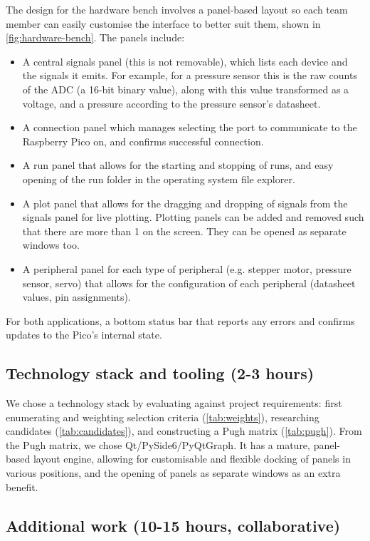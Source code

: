 \documentclass[10pt, a4paper]{article}
\begin{document}
The design for the hardware bench involves a panel-based layout so each team member can easily customise the interface to better suit them, shown in \autoref{fig:hardware-bench}.
The panels include:

\begin{itemize}[noitemsep]
  \item A central signals panel (this is not removable), which lists each device and the signals it emits. For example, for a pressure sensor this is the raw counts of the ADC (a 16-bit binary value), along with this value transformed as a voltage, and a pressure according to the pressure sensor's datasheet.
  \item A connection panel which manages selecting the port to communicate to the Raspberry Pico on, and confirms successful connection.
  \item A run panel that allows for the starting and stopping of runs, and easy opening of the run folder in the operating system file explorer.
  \item A plot panel that allows for the dragging and dropping of signals from the signals panel for live plotting. Plotting panels can be added and removed such that there are more than 1 on the screen. They can be opened as separate windows too.
  \item A peripheral panel for each type of peripheral (e.g. stepper motor, pressure sensor, servo) that allows for the configuration of each peripheral (datasheet values, pin assignments).
\end{itemize}

For both applications, a bottom status bar that reports any errors and confirms updates to the Pico's internal state.

\subsection{Technology stack and tooling (2-3 hours)}

We chose a technology stack by evaluating against project requirements: first enumerating and weighting selection criteria (\autoref{tab:weights}), researching candidates (\autoref{tab:candidates}), and constructing a Pugh matrix (\autoref{tab:pugh}).
From the Pugh matrix, we chose Qt/PySide6/PyQtGraph.
It has a mature, panel-based layout engine, allowing for customisable and flexible docking of panels in various positions, and the opening of panels as separate windows as an extra benefit.

\subsection{Additional work (10-15 hours, collaborative)}
\end{document}
